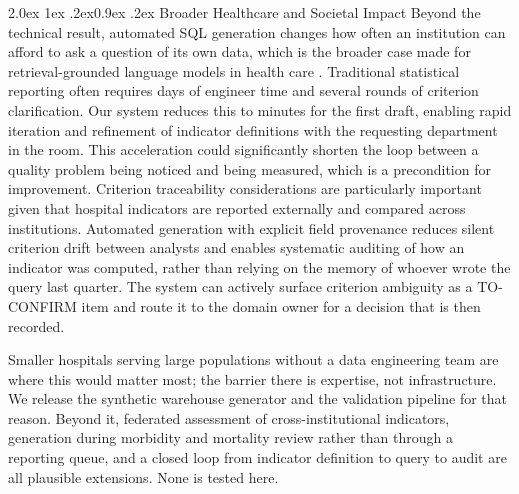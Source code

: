\documentclass[10pt]{article}
\makeatletter
\renewcommand\subsection{\@startsection{subsection}{2}{\z@}%
  {2.0ex \@plus 1ex \@minus .2ex}{0.9ex \@plus .2ex}%
  {\normalfont\normalsize\bfseries}}
\makeatother
\begin{document}
\subsection{Broader Healthcare and Societal Impact}
Beyond the technical result, automated SQL generation changes how often an institution can afford to ask a question of its own data, which is the broader case made for retrieval-grounded language models in health care \cite{ng2025}. Traditional statistical reporting often requires
days of engineer time and several rounds of criterion clarification. Our system
reduces this to minutes for the first draft, enabling rapid iteration and
refinement of indicator definitions with the requesting department in the room.
This acceleration could significantly shorten the loop between a quality problem
being noticed and being measured, which is a precondition for improvement.
Criterion traceability considerations are particularly important given that
hospital indicators are reported externally and compared across institutions.
Automated generation with explicit field provenance reduces silent
criterion drift between analysts and enables systematic auditing of how an
indicator was computed, rather than relying on the memory of whoever wrote the
query last quarter. The system can actively surface criterion ambiguity as a
TO-CONFIRM item and route it to the domain owner for a decision that is then
recorded.

Smaller hospitals serving large populations without a data engineering team are where this would matter most; the barrier there is expertise, not infrastructure. We release the synthetic warehouse generator and the validation pipeline for that reason. Beyond it, federated assessment of cross-institutional indicators, generation during morbidity and mortality review rather than through a reporting queue, and a closed loop from indicator definition to query to audit are all plausible extensions. None is tested here.
\end{document}
